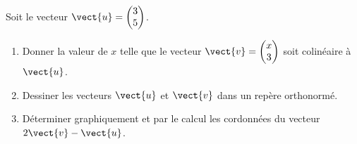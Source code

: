 
\begin{exercice}\label{exosmath-0061}

    Soit le vecteur \( \vect{ u }=\begin{pmatrix}
        3    \\ 
        5    
    \end{pmatrix}\).
    \begin{enumerate}
        \item
            Donner la valeur de \( x\) telle que le vecteur \( \vect{ v }= \begin{pmatrix}
                x    \\ 
                3    
            \end{pmatrix}\) soit colinéaire à \( \vect{ u }\).
        \item
            Dessiner les vecteurs \( \vect{ u }\) et \( \vect{ v }\) dans un repère orthonormé.
        \item
            Déterminer graphiquement et par le calcul les cordonnées du vecteur \( 2\vect{ v }-\vect{ u }\).
    \end{enumerate}

\end{exercice}
